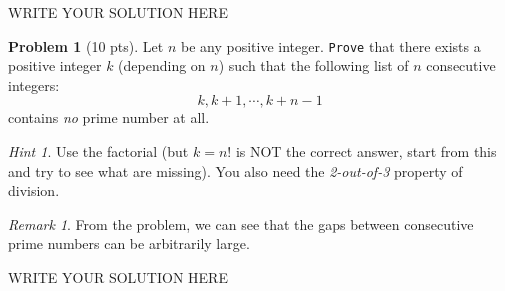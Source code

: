\documentclass[11pt]{article}
\theoremstyle{plain}
\theoremstyle{definition}
\newtheorem{problem}{Problem}
\theoremstyle{remark}
\newtheorem*{remark}{Remark}
\newtheorem*{hint}{Hint}
\numberwithin{equation}{problem}
\begin{document}
\begin{solution} %
WRITE YOUR SOLUTION HERE
\end{solution}\clearpage %






\begin{problem}[10 pts]
	Let $n$ be any positive integer. \texttt{Prove} that there exists a positive integer $k$ (depending on $n$) such that the following list of $n$ consecutive integers:
	\[
		k, k + 1, \cdots, k + n - 1
	\]
	contains \emph{no} prime number at all.
	\begin{hint}
		Use the factorial (but $k=n!$ is NOT the correct answer, start from this and try to see what are missing). You also need the \emph{2-out-of-3} property of division.
	\end{hint}
	\begin{remark}
		From the problem, we can see that the gaps between consecutive prime numbers can be arbitrarily large.
	\end{remark}
\end{problem}

\begin{solution} %
WRITE YOUR SOLUTION HERE
\end{solution}\clearpage %
\end{document}
